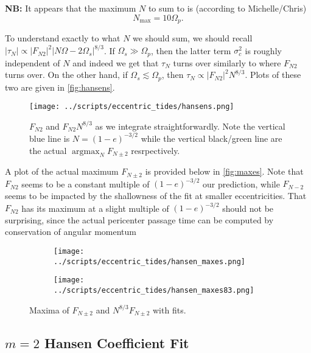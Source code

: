 \documentclass[11pt,
        usenames, %
        dvipsnames %
    ]{article}
\newcommand*{\abs}[1]{\left|#1\right|}
\newcommand*{\p}[1]{\left(#1\right)}
\DeclareMathOperator*{\argmax}{argmax}
\begin{document}
\textbf{NB:} It appears that the maximum $N$ to sum to is (according to
Michelle/Chris)
\begin{equation}
    N_{\max} = 10 \Omega_p.
\end{equation}

To understand exactly to what $N$ we should sum, we should recall $\abs{\tau_N}
\propto \abs{F_{N2}}^2 \abs{N\Omega - 2\Omega_s}^{8/3}$. If $\Omega_s \gg
\Omega_p$, then the latter term $\sigma_c^2$ is roughly independent of $N$ and
indeed we get that $\tau_N$ turns over similarly to where $F_{N2}$ turns over.
On the other hand, if $\Omega_s \lesssim \Omega_p$, then $\tau_N \propto
\abs{F_{N2}}^2 N^{8/3}$. Plots of these two are given in \autoref{fig:hansens}.
\begin{figure}[t]
    \centering
    \texttt{[image: ../scripts/eccentric\_tides/hansens.png]}
    \caption{$F_{N2}$ and $F_{N2} N^{8/3}$ as we integrate straightforwardly.
    Note the vertical blue line is $N = \p{1 - e}^{-3/2}$ while the vertical
    black/green line are the actual $\argmax_N F_{N\pm 2}$ resrpectively.
    }\label{fig:hansens}
\end{figure}

A plot of the actual maximum $F_{N \pm 2}$ is provided below in
\autoref{fig:maxes}. Note that $F_{N2}$ seems to be a constant multiple of
$\p{1 - e}^{-3/2}$ our prediction, while $F_{N-2}$ seems to be impacted by the
shallowness of the fit at smaller eccentricities. That $F_{N2}$ has its maximum
at a slight multiple of $\p{1 - e}^{-3/2}$ should not be surprising, since the
actual pericenter passage time can be computed by conservation of angular
momentum
\begin{figure}[t]
    \centering
    \begin{subfigure}{0.45\textwidth}
        \centering
        \texttt{[image: ../scripts/eccentric\_tides/hansen\_maxes.png]}
    \end{subfigure}
    \begin{subfigure}{0.45\textwidth}
        \centering
        \texttt{[image: ../scripts/eccentric\_tides/hansen\_maxes83.png]}
    \end{subfigure}
    \caption{Maxima of $F_{N\pm 2}$ and $N^{8/3}F_{N\pm 2}$ with
    fits.}\label{fig:maxes}
\end{figure}

\subsection{$m = 2$ Hansen Coefficient Fit}\label{ss:F_n2}
\end{document}
